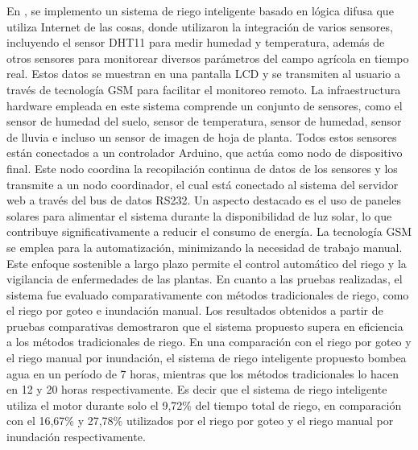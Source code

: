 \bigbreak
En \cite{krishnan_fuzzy_2020}, se implemento un sistema de riego inteligente basado en lógica difusa que utiliza Internet de las cosas, donde utilizaron la integración de varios sensores, incluyendo el sensor DHT11 para medir humedad y temperatura, además de otros sensores para monitorear diversos parámetros del campo agrícola en tiempo real. Estos datos se muestran en una pantalla LCD y se transmiten al usuario a través de tecnología GSM para facilitar el monitoreo remoto. La infraestructura hardware empleada en este sistema comprende un conjunto de sensores, como el sensor de humedad del suelo, sensor de temperatura, sensor de humedad, sensor de lluvia e incluso un sensor de imagen de hoja de planta. Todos estos sensores están conectados a un controlador Arduino, que actúa como nodo de dispositivo final. Este nodo coordina la recopilación continua de datos de los sensores y los transmite a un nodo coordinador, el cual está conectado al sistema del servidor web a través del bus de datos RS232. Un aspecto destacado es el uso de paneles solares para alimentar el sistema durante la disponibilidad de luz solar, lo que contribuye significativamente a reducir el consumo de energía. La tecnología GSM se emplea para la automatización, minimizando la necesidad de trabajo manual. Este enfoque sostenible a largo plazo permite el control automático del riego y la vigilancia de enfermedades de las plantas. En cuanto a las pruebas realizadas, el sistema fue evaluado comparativamente con métodos tradicionales de riego, como el riego por goteo e inundación manual. Los resultados obtenidos a partir de pruebas comparativas demostraron que el sistema propuesto supera en eficiencia a los métodos tradicionales de riego. En una comparación con el riego por goteo y el riego manual por inundación, el sistema de riego inteligente propuesto bombea agua en un período de 7 horas, mientras que los métodos tradicionales lo hacen en 12 y 20 horas respectivamente. Es decir que el sistema de riego inteligente utiliza el motor durante solo el 9,72\% del tiempo total de riego, en comparación con el 16,67\% y 27,78\% utilizados por el riego por goteo y el riego manual por inundación respectivamente.


